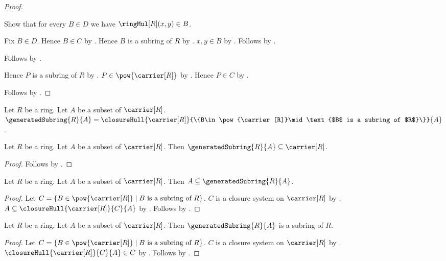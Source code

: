 \begin{proof}
\begin{subproof}
\begin{subproof}
            Show that for every $B\in D$ we have
                $\ringMul[R](x,y)\in B$.
            \begin{subproof}
                Fix $B\in D$.
                Hence $B\in C$ by .
                Hence $B$ is a subring of $R$ by \auto.
                $x,y\in B$ by .
                Follows by .
            \end{subproof}
            Follows by .
        \end{subproof}
        Hence $P$ is a subring of $R$ by .
        $P\in\pow{\carrier[R]}$ by .
        Hence $P\in C$ by \auto.
    \end{subproof}
    Follows by .
\end{proof}

\begin{definition}\label{generated_subring}
    Let $R$ be a ring.
    Let $A$ be a subset of $\carrier[R]$.
    $\generatedSubring{R}{A}=
        \closureHull{\carrier[R]}
            {\{B\in\pow{\carrier[R]}\mid
                \text{$B$ is a subring of $R$}\}}
            {A}$.
\end{definition}

\begin{proposition}\label{generated_subring_subseteq_carrier}
    Let $R$ be a ring.
    Let $A$ be a subset of $\carrier[R]$.
    Then $\generatedSubring{R}{A}\subseteq\carrier[R]$.
\end{proposition}
\begin{proof}
    Follows by .
\end{proof}

\begin{proposition}\label{generated_subring_contains_generators}
    Let $R$ be a ring.
    Let $A$ be a subset of $\carrier[R]$.
    Then $A\subseteq\generatedSubring{R}{A}$.
\end{proposition}
\begin{proof}
    Let
        $C=\{B\in\pow{\carrier[R]}\mid
            \text{$B$ is a subring of $R$}\}$.
    $C$ is a closure system on $\carrier[R]$ by
        .
    $A\subseteq\closureHull{\carrier[R]}{C}{A}$ by
        .
    Follows by .
\end{proof}

\begin{theorem}\label{generated_subring_is_subring}
    Let $R$ be a ring.
    Let $A$ be a subset of $\carrier[R]$.
    Then $\generatedSubring{R}{A}$ is a subring of $R$.
\end{theorem}
\begin{proof}
    Let
        $C=\{B\in\pow{\carrier[R]}\mid
            \text{$B$ is a subring of $R$}\}$.
    $C$ is a closure system on $\carrier[R]$ by
        .
    $\closureHull{\carrier[R]}{C}{A}\in C$ by
        .
    Follows by .
\end{proof}


